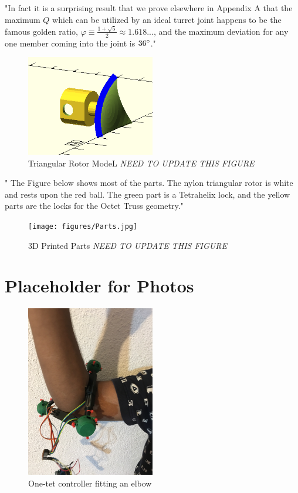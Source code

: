 \documentclass[11pt]{article}
\begin{document}
"In fact it is a surprising result that we prove elsewhere \cite{readglussbot} in Appendix A that the maximum $Q$ which can be utilized
by an ideal turret joint happens to be
the famous golden ratio, $\varphi \equiv \frac{1 + \sqrt{5}}{2} \approx 1.618...$, and the maximum deviation for any one member coming
into the joint is $36\degree$."

 \begin{figure}[H]
  \centering
    \includegraphics[width=0.5\textwidth]{figures/RotorModel.png}
    \caption[Triangular Rotor Model]{Triangular Rotor ModeL \emph{NEED TO UPDATE THIS FIGURE}}
      \label{rotormodel}
\end{figure}



" The Figure below shows most of the parts. The nylon triangular rotor is white and rests upon
 the red ball. The green part is a Tetrahelix lock, and the yellow parts are the locks for the Octet Truss
 geometry."

\begin{figure}[H]
  \centering
    \texttt{[image: figures/Parts.jpg]}
    \caption[3D Printed Parts]{3D Printed Parts \emph{NEED TO UPDATE THIS FIGURE}}
\end{figure}




\section{Placeholder for Photos}

\begin{figure}[H]
  \centering
    \includegraphics[angle=270,width=0.5\textwidth]{figures/ElbowFitting.JPG}
    \caption[One-tet controller fitting an elbow]{One-tet controller fitting an elbow}
      \label{fig:elbowfitting}
\end{figure}
\end{document}
